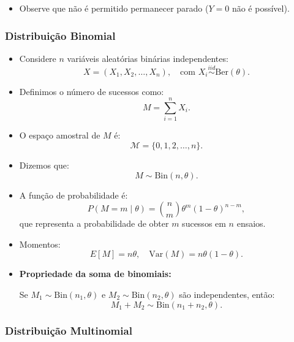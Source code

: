 \documentclass[
  letterpaper,
  DIV=11,
  numbers=noendperiod]{scrreprt}
\providecommand{\tightlist}{%
  \setlength{\itemsep}{0pt}\setlength{\parskip}{0pt}}\usepackage{longtable,booktabs,array}
\begin{document}
\begin{itemize}
  \begin{itemize}
  \tightlist
  \item
    \(Y = +1\) representa um passo para frente;
  \item
    \(Y = -1\) representa um passo para trás.
  \end{itemize}
\item
  Observe que não é permitido permanecer parado (\(Y = 0\) não é
  possível).
\end{itemize}

\subsubsection*{Distribuição
Binomial}\label{distribuiuxe7uxe3o-binomial}

\begin{itemize}
\item
  Considere \(n\) variáveis aleatórias binárias independentes:
  \[X = (X_1, X_2, \dots, X_n), \quad \text{com } X_i \overset{iid}{\sim} \text{Ber}(\theta).\]
\item
  Definimos o número de sucessos como: \[M = \sum_{i=1}^n X_i.\]
\item
  O espaço amostral de \(M\) é: \[\mathcal{M} = \{0,1,2,\dots,n\}.\]
\item
  Dizemos que: \[M \sim \text{Bin}(n, \theta).\]
\item
  A função de probabilidade é:
  \[P(M = m \mid \theta) = \binom{n}{m} \theta^m (1 - \theta)^{n-m},\]
  que representa a probabilidade de obter \(m\) sucessos em \(n\)
  ensaios.
\item
  Momentos:
  \[E[M] = n\theta, \quad \text{Var}(M) = n\theta(1 - \theta).\]
\item
  \textbf{Propriedade da soma de binomiais:}

  Se \(M_1 \sim \text{Bin}(n_1, \theta)\) e
  \(M_2 \sim \text{Bin}(n_2, \theta)\) são independentes, então:
  \[M_1 + M_2 \sim \text{Bin}(n_1 + n_2, \theta).\]
\end{itemize}

\subsubsection*{Distribuição
Multinomial}\label{distribuiuxe7uxe3o-multinomial}
\end{document}
